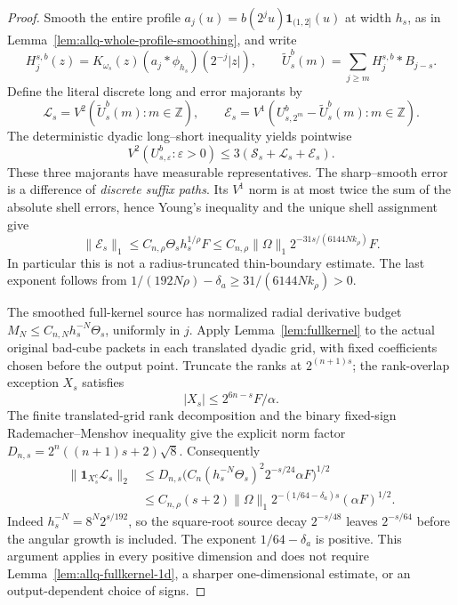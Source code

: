\documentclass[11pt]{article}
\numberwithin{equation}{section}
\theoremstyle{remark}
\theoremstyle{definition}
\begin{document}
\begin{proof}
Smooth the entire profile
$a_j(u)=b(2^ju)\mathbf1_{(1,2]}(u)$ at width $h_s$, as in
Lemma~\ref{lem:allq-whole-profile-smoothing}, and write
\[
 H_j^{s,b}(z)=K_{\omega_s}(z)(a_j*\phi_{h_s})(2^{-j}|z|),
 \qquad
 \widetilde U_s^b(m)=\sum_{j\ge m}H_j^{s,b}*B_{j-s}.
\]
Define the literal discrete long and error majorants by
\[
 \mathcal L_s=V^2(\widetilde U_s^b(m):m\in\mathbb Z),\qquad
 \mathcal E_s=V^1(U_{s,2^m}^b-\widetilde U_s^b(m):m\in\mathbb Z).
\]
The deterministic dyadic long--short inequality yields pointwise
\[
 V^2(U_{s,\varepsilon}^b:\varepsilon>0)
 \le3(\mathcal S_s+\mathcal L_s+\mathcal E_s).
\]
These three majorants have measurable representatives.  The sharp--smooth
error is a difference of \emph{discrete suffix paths}.  Its $V^1$ norm
is at most twice the sum of the absolute shell errors, hence Young's
inequality and the unique shell assignment give
\begin{equation}\label{eq:allq-weak-unsmooth-sum}
 \|\mathcal E_s\|_1
 \le C_{n,\rho}\Theta_s h_s^{1/\rho}F
 \le C_{n,\rho}\|\Omega\|_1
       2^{-31s/(6144Nk_\rho)}F.
\end{equation}
In particular this is not a radius-truncated thin-boundary estimate.
The last exponent follows from
$1/(192N\rho)-\delta_a\ge31/(6144Nk_\rho)>0$.

The smoothed full-kernel source has normalized radial derivative budget
$M_N\le C_{n,N}h_s^{-N}\Theta_s$, uniformly in $j$.
Apply Lemma~\ref{lem:fullkernel} to the actual original bad-cube packets
in each translated dyadic grid, with fixed coefficients chosen before
the output point.  Truncate the ranks at $2^{(n+1)s}$; the rank-overlap
exception $X_s$ satisfies
\[
 |X_s|\le2^{6n-s}F/\alpha.
\]
The finite translated-grid rank decomposition and the binary fixed-sign
Rademacher--Menshov inequality give the explicit norm factor
$D_{n,s}=2^n((n+1)s+2)\sqrt8$.  Consequently
\begin{equation}\label{eq:allq-weak-long-decay}
 \begin{split}
 \|\mathbf1_{X_s^c}\mathcal L_s\|_2
 &\le D_{n,s}
   \bigl(C_n(h_s^{-N}\Theta_s)^2 2^{-s/24}\alpha F\bigr)^{1/2}\\
 &\le C_{n,\rho}(s+2)\|\Omega\|_1
       2^{-(1/64-\delta_a)s}(\alpha F)^{1/2}.
 \end{split}
\end{equation}
Indeed $h_s^{-N}=8^N2^{s/192}$, so the square-root source decay
$2^{-s/48}$ leaves $2^{-s/64}$ before the angular growth is included.
The exponent $1/64-\delta_a$ is positive.  This argument applies in
every positive dimension and does not require
Lemma~\ref{lem:allq-fullkernel-1d}, a sharper one-dimensional estimate,
or an output-dependent choice of signs.


\end{proof}
\end{document}
